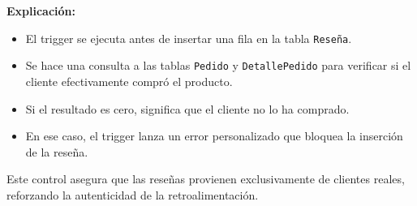 \textbf{Explicación:}

\begin{itemize}
  \item El trigger se ejecuta antes de insertar una fila en la tabla \texttt{Reseña}.
  \item Se hace una consulta a las tablas \texttt{Pedido} y \texttt{DetallePedido} para verificar si el cliente efectivamente compró el producto.
  \item Si el resultado es cero, significa que el cliente no lo ha comprado.
  \item En ese caso, el trigger lanza un error personalizado que bloquea la inserción de la reseña.
\end{itemize}

Este control asegura que las reseñas provienen exclusivamente de clientes reales, reforzando la autenticidad de la retroalimentación.
